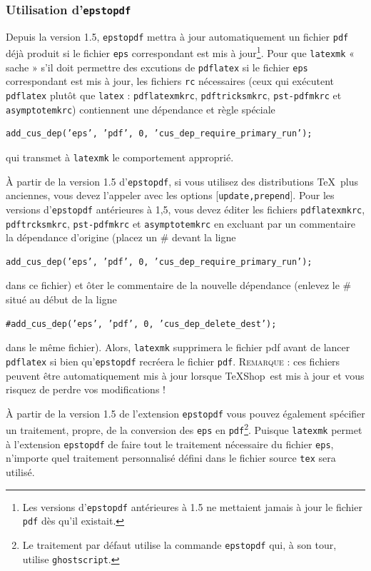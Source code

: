 \documentclass[11pt,french]{article}
\newcommand{\TS}{\textsf{\TeX Shop}}
\begin{document}
\subsubsection{Utilisation d'\texttt{epstopdf}}

Depuis la version 1.5, \texttt{epstopdf} mettra à jour automatiquement un fichier \texttt{pdf} déjà produit si le fichier \texttt{eps} correspondant est mis à jour\footnote{Les versions d'\texttt{epstopdf} antérieures à 1.5 ne mettaient jamais à jour le fichier \texttt{pdf} dès qu'il existait.}. Pour que \texttt{latexmk} « sache » s'il doit permettre des excutions de \texttt{pdflatex} si le fichier \texttt{eps} correspondant est mis à jour, les fichiers \texttt{rc} nécessaires (ceux qui exécutent \texttt{pdflatex} plutôt que \texttt{latex} : \texttt{pdflatexmkrc}, \texttt{pdftricksmkrc}, \texttt{pst-pdfmkrc} et \texttt{asymptotemkrc}) contiennent une dépendance et règle spéciale

\begin{verbatim}
add_cus_dep(’eps’, ’pdf’, 0, ’cus_dep_require_primary_run’);
\end{verbatim}
qui transmet à \texttt{latexmk} le comportement approprié.

À partir de la version 1.5 d'\texttt{epstopdf}, si vous utilisez des distributions \TeX\ plus anciennes, vous devez l'appeler avec les options [\texttt{update,prepend}]. Pour les versions d'\texttt{epstopdf} antérieures à 1,5, vous devez éditer les fichiers \texttt{pdflatexmkrc}, \texttt{pdftrcksmkrc}, \texttt{pst-pdfmkrc} et \texttt{asymptotemkrc} en excluant par un commentaire la dépendance d'origine (placez un \# devant la ligne
\begin{verbatim}
add_cus_dep(’eps’, ’pdf’, 0, ’cus_dep_require_primary_run’);
\end{verbatim}
dans ce fichier) et ôter le commentaire de la nouvelle dépendance (enlevez le \# situé au début de la ligne
\begin{verbatim}
#add_cus_dep(’eps’, ’pdf’, 0, ’cus_dep_delete_dest’);
\end{verbatim}
dans le même fichier). Alors, \texttt{latexmk} supprimera le fichier pdf avant de lancer \texttt{pdflatex} si bien qu'\texttt{epstopdf} recréera le fichier \texttt{pdf}. \textsc{Remarque} : ces fichiers peuvent être automatiquement mis à jour lorsque \TS\ est mis à jour et vous risquez de perdre vos modifications !

À partir de la version 1.5 de l'extension \texttt{epstopdf} vous pouvez également spécifier un traitement, propre, de la conversion des \texttt{eps} en \texttt{pdf}\footnote{Le traitement par défaut utilise la commande \texttt{epstopdf} qui, à son tour, utilise \texttt{ghostscript}.}. Puisque \texttt{latexmk} permet à l'extension \texttt{epstopdf} de faire tout le traitement nécessaire du fichier \texttt{eps}, n'importe quel traitement personnalisé défini dans le fichier source \texttt{tex} sera utilisé.
\end{document}
